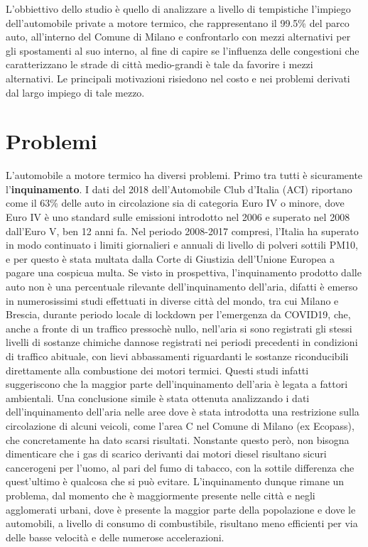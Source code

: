 L'obbiettivo dello studio è quello di analizzare a livello di tempistiche l'impiego dell'automobile private a motore termico, che rappresentano il 99.5\% del parco auto\cite{anfiastudiestatistiche}, all'interno del Comune di Milano e confrontarlo con mezzi alternativi per gli spostamenti al suo interno, al fine di capire se l'influenza delle congestioni che caratterizzano le strade di città medio-grandi è tale da favorire i mezzi alternativi. Le principali motivazioni risiedono nel costo e nei problemi derivati dal largo impiego di tale mezzo.

\section{Problemi}

L'automobile a motore termico ha diversi problemi. Primo tra tutti è sicuramente l'\textbf{inquinamento}. I dati del 2018 dell'Automobile Club d'Italia (ACI) riportano come il 63\% delle auto in circolazione sia di categoria Euro IV o minore\cite{anfiastudiestatistiche}, dove Euro IV è uno standard sulle emissioni introdotto nel 2006 e superato nel 2008 dall'Euro V, ben 12 anni fa\cite{euroivstandard}. Nel periodo 2008-2017 compresi, l'Italia ha superato in modo continuato i limiti giornalieri e annuali di livello di polveri sottili PM10, e per questo è stata multata dalla Corte di Giustizia dell'Unione Europea a pagare una cospicua multa\cite{eunewssanzioneitalia}. Se visto in prospettiva, l'inquinamento prodotto dalle auto non è una percentuale rilevante dell'inquinamento dell'aria, difatti è emerso in numerosissimi studi effettuati in diverse città del mondo, tra cui Milano e Brescia\cite{collivignarelli2020}\cite{camaletti2020}, durante periodo locale di lockdown per l'emergenza da COVID19, che, anche a fronte di un traffico pressochè nullo, nell'aria si sono registrati gli stessi livelli di sostanze chimiche dannose registrati nei periodi precedenti in condizioni di traffico abituale, con lievi abbassamenti riguardanti le sostanze riconducibili direttamente alla combustione dei motori termici. Questi studi infatti suggeriscono che la maggior parte dell'inquinamento dell'aria è legata a fattori ambientali. Una conclusione simile è stata ottenuta analizzando i dati dell'inquinamento dell'aria nelle aree dove è stata introdotta una restrizione sulla circolazione di alcuni veicoli, come l'area C nel Comune di Milano (ex Ecopass), che concretamente ha dato scarsi risultati\cite{trentini2014}. Nonstante questo però, non bisogna dimenticare che i gas di scarico derivanti dai motori diesel risultano sicuri cancerogeni per l'uomo, al pari del fumo di tabacco, con la sottile differenza che quest'ultimo è qualcosa che si può evitare\cite{iarctable}. L'inquinamento dunque rimane un problema, dal momento che è maggiormente presente nelle città e negli agglomerati urbani, dove è presente la maggior parte della popolazione e dove le automobili, a livello di consumo di combustibile, risultano meno efficienti per via delle basse velocità e delle numerose accelerazioni.

